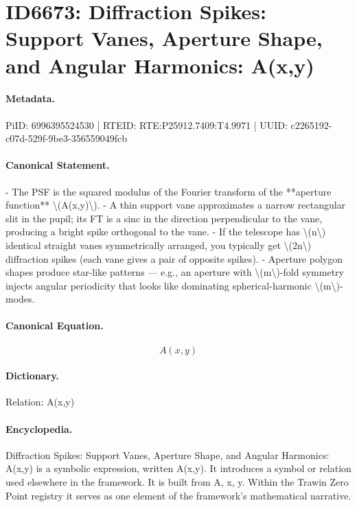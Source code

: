 \section*{ID6673: Diffraction Spikes: Support Vanes, Aperture Shape, and Angular Harmonics: A(x,y)}
\paragraph{Metadata.}
PiID: 6996395524530 | RTEID: RTE:P25912.7409:T4.9971 | UUID: c2265192-c07d-529f-9be3-356559049fcb

\paragraph{Canonical Statement.}
- The PSF is the squared modulus of the Fourier transform of the **aperture function** \textbackslash{}(A(x,y)\textbackslash{}). - A thin support vane approximates a narrow rectangular slit in the pupil; its FT is a sinc in the direction perpendicular to the vane, producing a bright spike orthogonal to the vane. - If the telescope has \textbackslash{}(n\textbackslash{}) identical straight vanes symmetrically arranged, you typically get \textbackslash{}(2n\textbackslash{}) diffraction spikes (each vane gives a pair of opposite spikes). - Aperture polygon shapes produce star-like patterns — e.g., an aperture with \textbackslash{}(m\textbackslash{})-fold symmetry injects angular periodicity that looks like dominating spherical-harmonic \textbackslash{}(m\textbackslash{})-modes.

\paragraph{Canonical Equation.}
\[
A(x,y)
\]

\paragraph{Dictionary.}
Relation: A(x,y)

\paragraph{Encyclopedia.}
Diffraction Spikes: Support Vanes, Aperture Shape, and Angular Harmonics: A(x,y) is a symbolic expression, written A(x,y). It introduces a symbol or relation used elsewhere in the framework. It is built from A, x, y. Within the Trawin Zero Point registry it serves as one element of the framework's mathematical narrative.

